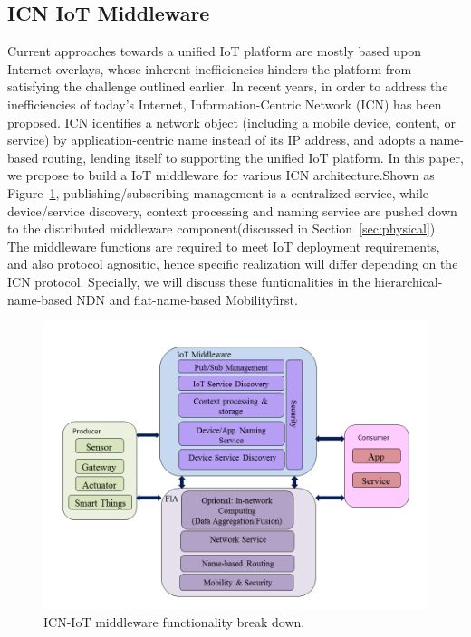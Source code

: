 \subsection{ICN IoT Middleware}
Current approaches towards a unified IoT platform are mostly based upon Internet overlays, whose inherent inefficiencies hinders the platform from satisfying the challenge outlined earlier. In recent years, in order to address  the inefficiencies of today's Internet, Information-Centric Network (ICN) has been proposed. ICN identifies a network object (including a mobile device, content, or service) by application-centric name instead of its IP address, and adopts a name-based routing, lending itself to supporting the unified IoT platform. In this paper, we propose to build a IoT middleware for various ICN architecture.Shown as Figure~\ref{fig:mid_arch}, publishing/subscribing management is a centralized service, while device/service discovery, context processing and naming service are pushed down to the distributed middleware component(discussed in Section~\ref{sec:physical}). The middleware functions are required to meet IoT deployment requirements, and also protocol agnositic, hence specific realization will differ depending on the ICN protocol. Specially, we will discuss these funtionalities in the hierarchical-name-based NDN and flat-name-based Mobilityfirst. 
\begin{figure}
\centering
\includegraphics[width=\columnwidth]{figure/middleware_architecture.png}
\caption{\label{fig:mid_arch} ICN-IoT middleware functionality break down.}
\end{figure}
